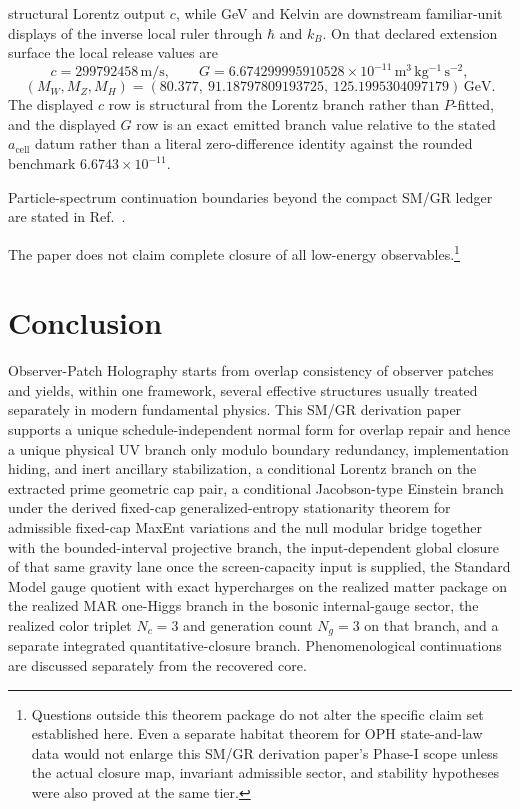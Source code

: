\documentclass[11pt]{article}
\begin{document}
structural Lorentz output \(c\), while GeV and Kelvin are downstream familiar-unit displays of the
inverse local ruler through \(\hbar\) and \(k_B\).
On that declared extension surface the local release values are
\[
c=299792458\,\mathrm{m/s},
\qquad
G=6.674299995910528\times10^{-11}\,\mathrm{m^3\,kg^{-1}\,s^{-2}},
\]
\[
(M_W,M_Z,M_H)=
(80.377,\ 91.18797809193725,\ 125.1995304097179)\,\mathrm{GeV}.
\]
The displayed \(c\) row is structural from the Lorentz branch rather than \(P\)-fitted, and the
displayed \(G\) row is an exact emitted branch value relative to the stated \(a_{\mathrm{cell}}\)
datum rather than a literal zero-difference identity against the rounded benchmark
\(6.6743\times10^{-11}\).

Particle-spectrum continuation boundaries beyond the compact SM/GR ledger are stated in Ref.~\cite{ophparticles}.

The paper does not claim complete closure of all low-energy observables.\footnote{Questions outside this theorem package do not alter the specific claim set established here. Even a separate habitat theorem for OPH state-and-law data would not enlarge this SM/GR derivation paper's Phase-I scope unless the actual closure map, invariant admissible sector, and stability hypotheses were also proved at the same tier.}
\section{Conclusion}

Observer-Patch Holography starts from overlap consistency of observer patches and yields, within one framework, several effective structures usually treated separately in modern fundamental physics. This SM/GR derivation paper supports a unique schedule-independent normal form for overlap repair and hence a unique physical UV branch only modulo boundary redundancy, implementation hiding, and inert ancillary stabilization, a conditional Lorentz branch on the extracted prime geometric cap pair, a conditional Jacobson-type Einstein branch under the derived fixed-cap generalized-entropy stationarity theorem for admissible fixed-cap MaxEnt variations and the null modular bridge together with the bounded-interval projective branch, the input-dependent global closure of that same gravity lane once the screen-capacity input is supplied, the Standard Model gauge quotient with exact hypercharges on the realized matter package on the realized MAR one-Higgs branch in the bosonic internal-gauge sector, the realized color triplet \(N_c=3\) and generation count \(N_g=3\) on that branch, and a separate integrated quantitative-closure branch. Phenomenological continuations are discussed separately from the recovered core.
\end{document}
